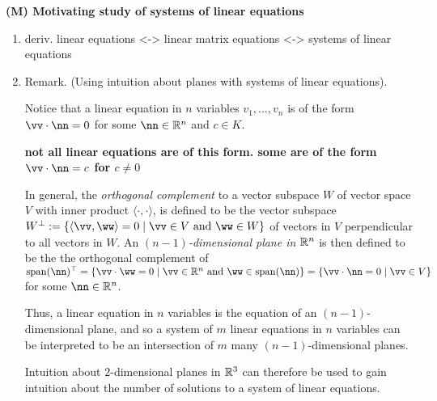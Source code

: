 \textbf{(M) Motivating study of systems of linear equations}
\begin{enumerate}
    \item deriv. linear equations <-> linear matrix equations <-> systems of linear equations
    \item Remark. (Using intuition about planes with systems of linear equations). 
    
    Notice that a linear equation in $n$ variables $v_1, ..., v_n$ is of the form $\vv \cdot \nn = 0$ for some $\nn \in \R^n$ and $c \in K$. 

    \textbf{not all linear equations are of this form. some are of the form $\vv \cdot \nn = c$ for $c \neq 0$}
    
    In general, the \textit{orthogonal complement} to a vector subspace $W$ of vector space $V$ with inner product $\langle \cdot, \cdot \rangle$, is defined to be the vector subspace $W^\perp := \{ \langle \vv, \ww \rangle = 0 \mid \vv \in V \text{ and } \ww \in W \}$ of vectors in $V$ perpendicular to all vectors in $W$. An \textit{$(n - 1)$-dimensional plane in $\mathbb{R}^n$} is then defined to be the the orthogonal complement of $\spann(\nn)^\top = \{ \vv \cdot \ww = 0 \mid \vv \in \R^n \text{ and } \ww \in \spann(\nn)\} = \{ \vv \cdot \nn = 0 \mid \vv \in V\}$ for some $\nn \in \R^n$.
    
    Thus, a linear equation in $n$ variables is the equation of an $(n - 1)$-dimensional plane, and so a system of $m$ linear equations in $n$ variables can be interpreted to be an intersection of $m$ many $(n - 1)$-dimensional planes.

    Intuition about $2$-dimensional planes in $\mathbb{R}^3$ can therefore be used to gain intuition about the number of solutions to a system of linear equations.
\end{enumerate}

